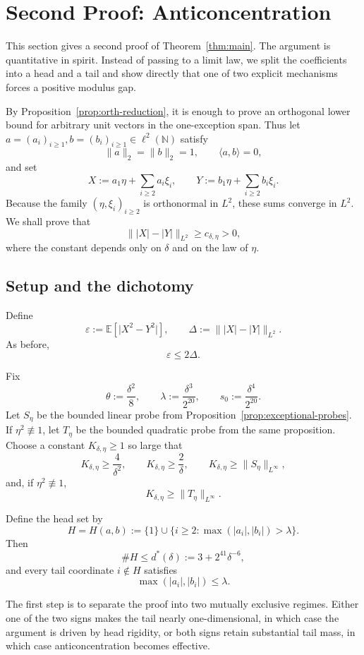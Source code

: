 \documentclass[11pt]{amsart}
\numberwithin{equation}{section}
\theoremstyle{definition}
\theoremstyle{remark}
\newcommand{\E}{\mathbb E}
\newcommand{\N}{\mathbb N}
\newcommand{\eps}{\varepsilon}
\newcommand{\abs}[1]{\lvert #1 \rvert}
\newcommand{\norm}[1]{\lVert #1 \rVert}
\newcommand{\ip}[2]{\langle #1,#2\rangle}
\begin{document}
\section{Second Proof: Anticoncentration}\label{sec:quant-proof}

This section gives a second proof of Theorem~\ref{thm:main}.  The argument is
quantitative in spirit.  Instead of passing to a limit law, we split the
coefficients into a head and a tail and show directly that one of two explicit
mechanisms forces a positive modulus gap.

By Proposition~\ref{prop:orth-reduction}, it is enough to prove an orthogonal
lower bound for arbitrary unit vectors in the one-exception span.  Thus let
$a=(a_i)_{i\ge1}, b=(b_i)_{i\ge1}\in \ell^2(\N)$ satisfy
\[
\norm{a}_2=\norm{b}_2=1,
\qquad
\ip{a}{b}=0,
\]
and set
\[
X:=a_1\eta+\sum_{i\ge2} a_i\xi_i,
\qquad
Y:=b_1\eta+\sum_{i\ge2} b_i\xi_i.
\]
Because the family $(\eta,\xi_i)_{i\ge2}$ is orthonormal in $L^2$, these sums
converge in $L^2$.  We shall prove that
\[
\norm{|X|-|Y|}_{L^2}\ge c_{\delta,\eta}>0,
\]
where the constant depends only on $\delta$ and on the law of $\eta$.

\subsection{Setup and the dichotomy}

Define
\[
\eps:=\E[\abs{X^2-Y^2}],
\qquad
\Delta:=\norm{|X|-|Y|}_{L^2}.
\]
As before,
\[
\eps\le 2\Delta.
\]

Fix
\[
\theta:=\frac{\delta^2}{8},
\qquad
\lambda:=\frac{\delta^3}{2^{20}},
\qquad
s_0:=\frac{\delta^4}{2^{20}}.
\]
Let $S_\eta$ be the bounded linear probe from
Proposition~\ref{prop:exceptional-probes}.  If $\eta^2\not\equiv1$, let
$T_\eta$ be the bounded quadratic probe from the same proposition.  Choose a
constant $K_{\delta,\eta}\ge1$ so large that
\[
K_{\delta,\eta}\ge \frac{4}{\delta^2},
\qquad
K_{\delta,\eta}\ge \frac{2}{\delta},
\qquad
K_{\delta,\eta}\ge \norm{S_\eta}_{L^\infty},
\]
and, if $\eta^2\not\equiv1$,
\[
K_{\delta,\eta}\ge \norm{T_\eta}_{L^\infty}.
\]

Define the head set by
\[
H=H(a,b):=\{1\}\cup\{i\ge2:\max(|a_i|,|b_i|)>\lambda\}.
\]
Then
\[
\#H\le d^*(\delta):=3+2^{41}\delta^{-6},
\]
and every tail coordinate $i\notin H$ satisfies
\[
\max(|a_i|,|b_i|)\le \lambda.
\]

The first step is to separate the proof into two mutually exclusive regimes.
Either one of the two signs makes the tail nearly one-dimensional, in which
case the argument is driven by head rigidity, or both signs retain substantial
tail mass, in which case anticoncentration becomes effective.
\end{document}
